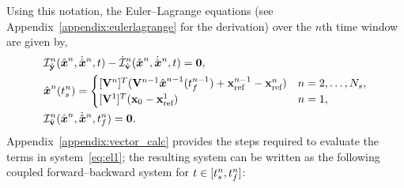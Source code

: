 Using this notation, the Euler--Lagrange equations (see
Appendix~\ref{appendix:eulerlagrange} for the derivation) over the $n$th
time window are given by, 
\begin{equation}\label{eq:el1} 
\begin{split}
& \dIdYArg{n}(\genstateArgnt{n},\genstateDotArgnt{n},t) - \dIdVDotArg{n}(\genstateArgnt{n},\genstateDotArgnt{n}, t )  = \bz, \\ 
&\genstate^n(\timeStartArg{n})  = \begin{cases} 
\spatialIC &
n=2,\ldots,\nslabs, \\ 
\genstateICOne & n=1,
\end{cases}\\ 
&\dIdVArg{n}(\genstateArgnt{n},\genstateDotArgnt{n},\timeEndArg{n})  = \bz.
\end{split} 
\end{equation}
Appendix~\ref{appendix:vector_calc} provides the steps required to evaluate
the terms in system~\eqref{eq:el1}; the resulting system can be written as the
following coupled forward--backward system for $t \in
[t_s^{n},t_f^{n} ]$:
